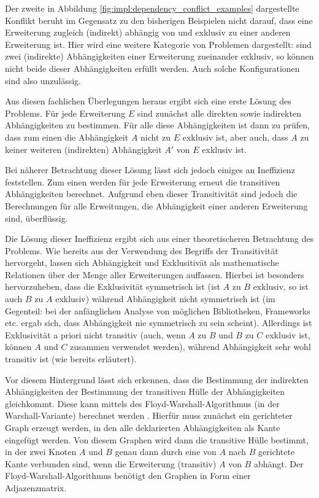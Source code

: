Der zweite in Abbildung \ref{fig:impl:dependency_conflict_examples} dargestellte Konflikt beruht im Gegensatz zu den bisherigen Beispielen nicht darauf, dass eine Erweiterung zugleich (indirekt) abhängig von und exklusiv zu einer anderen Erweiterung ist. Hier wird eine weitere Kategorie von Problemen dargestellt: sind zwei (indirekte) Abhängigkeiten einer Erweiterung zueinander exklusiv, so können nicht beide dieser Abhängigkeiten erfüllt werden. Auch solche Konfigurationen sind also unzulässig.

Aus diesen fachlichen Überlegungen heraus ergibt sich eine erste Lösung des Problems. Für jede Erweiterung $E$ sind zunächst alle direkten sowie indirekten Abhängigkeiten zu bestimmen. Für alle diese Abhängigkeiten ist dann zu prüfen, dass zum einen die Abhängigkeit $A$ nicht zu $E$ exklusiv ist, aber auch, dass $A$ zu keiner weiteren (indirekten) Abhängigkeit $A'$ von $E$ exklusiv ist.

Bei näherer Betrachtung dieser Lösung lässt sich jedoch einiges an Ineffizienz feststellen. Zum einen werden für jede Erweiterung erneut die transitiven Abhängigkeiten berechnet. Aufgrund eben dieser Transitivität sind jedoch die Berechnungen für alle Erweitungen, die Abhängigkeit einer anderen Erweiterung sind, überflüssig.

Die Lösung dieser Ineffizienz ergibt sich aus einer theoretischeren Betrachtung des Problems. Wie bereits aus der Verwendung des Begriffs der Transitivität hervorgeht, lassen sich Abhängigkeit und Exklusitivät als mathematische Relationen über der Menge aller Erweiterungen auffassen. Hierbei ist besonders hervorzuheben, dass die Exklusivität symmetrisch ist (ist $A$ zu $B$ exklusiv, so ist auch $B$ zu $A$ exklusiv) während Abhängigkeit nicht symmetrisch ist (im Gegenteil: bei der anfänglichen Analyse von möglichen Bibliotheken, Frameworks etc. ergab sich, dass Abhängigkeit nie symmetrisch zu sein scheint). Allerdings ist Exklusivität a priori nicht transitiv (auch, wenn $A$ zu $B$ und $B$ zu $C$ exklusiv ist, können $A$ und $C$ zusammen verwendet werden), während Abhängigkeit sehr wohl transitiv ist (wie bereits erläutert).

Vor diesem Hintergrund lässt sich erkennen, dass die Bestimmung der indirekten Abhängigkeiten der Bestimmung der transitiven Hülle der Abhängigkeiten gleichkommt. Diese kann mittels des Floyd-Warshall-Algorithmus (in der Warshall-Variante) berechnet werden \cite{warshal1_algorithm}. Hierfür muss zunächst ein gerichteter Graph erzeugt werden, in den alle deklarierten Abhängigkeiten als Kante eingefügt werden. Von diesem Graphen wird dann die transitive Hülle bestimmt, in der zwei Knoten $A$ und $B$ genau dann durch eine von $A$ nach $B$ gerichtete Kante verbunden sind, wenn die Erweiterung (transitiv) $A$ von $B$ abhängt. Der Floyd-Warshall-Algorithmus benötigt den Graphen in Form einer Adjazenzmatrix.

